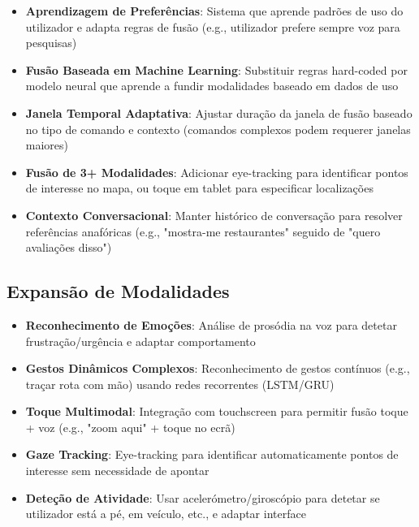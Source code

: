 \begin{itemize}
    \item \textbf{Aprendizagem de Preferências}: Sistema que aprende padrões de uso do utilizador e adapta regras de fusão (e.g., utilizador prefere sempre voz para pesquisas)

    \item \textbf{Fusão Baseada em Machine Learning}: Substituir regras hard-coded por modelo neural que aprende a fundir modalidades baseado em dados de uso

    \item \textbf{Janela Temporal Adaptativa}: Ajustar duração da janela de fusão baseado no tipo de comando e contexto (comandos complexos podem requerer janelas maiores)

    \item \textbf{Fusão de 3+ Modalidades}: Adicionar eye-tracking para identificar pontos de interesse no mapa, ou toque em tablet para especificar localizações

    \item \textbf{Contexto Conversacional}: Manter histórico de conversação para resolver referências anafóricas (e.g., "mostra-me restaurantes" seguido de "quero avaliações disso")
\end{itemize}

\subsection{Expansão de Modalidades}

\begin{itemize}
    \item \textbf{Reconhecimento de Emoções}: Análise de prosódia na voz para detetar frustração/urgência e adaptar comportamento

    \item \textbf{Gestos Dinâmicos Complexos}: Reconhecimento de gestos contínuos (e.g., traçar rota com mão) usando redes recorrentes (LSTM/GRU)
    \item \textbf{Toque Multimodal}: Integração com touchscreen para permitir fusão toque + voz (e.g., "zoom aqui" + toque no ecrã)

    \item \textbf{Gaze Tracking}: Eye-tracking para identificar automaticamente pontos de interesse sem necessidade de apontar

    \item \textbf{Deteção de Atividade}: Usar acelerómetro/giroscópio para detetar se utilizador está a pé, em veículo, etc., e adaptar interface
\end{itemize}

